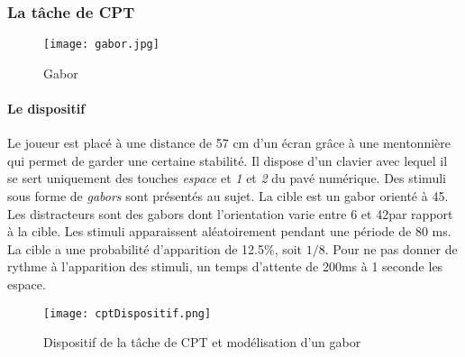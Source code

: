 \subsubsection{La tâche de CPT}

\begin{wrapfigure}[7]{l}{2.3cm}
\vspace{-15pt}
\texttt{[image: gabor.jpg]}
\captionsetup{labelformat=simpleNumber}
\caption{Gabor}
\end{wrapfigure}

\paragraph{Le dispositif}Le joueur est placé à une distance de 57 cm d'un écran grâce à une mentonnière qui permet de garder une certaine stabilité. Il dispose d'un clavier avec
lequel il se sert uniquement des touches \emph{espace} et \emph{1} et \emph{2} du pavé numérique. Des stimuli sous forme de \emph{\glspl{gabor}} sont présentés au sujet. La cible est un gabor
orienté à 45\degre. Les distracteurs sont des gabors dont l'orientation varie entre 6 et 42\degre par rapport à la cible. Les stimuli apparaissent aléatoirement pendant une période de
80 ms. La cible a une probabilité d'apparition de 12.5\%, soit $1/8$. Pour ne pas donner de rythme à l'apparition des stimuli, un temps d'attente de 200ms à 1 seconde les espace.

\begin{figure}[H]
    \begin{center}
    \texttt{[image: cptDispositif.png]}
    \end{center}
    \caption{Dispositif de la tâche de CPT et modélisation d'un gabor}
\label{CptDispositif}
\end{figure}

\newpage
